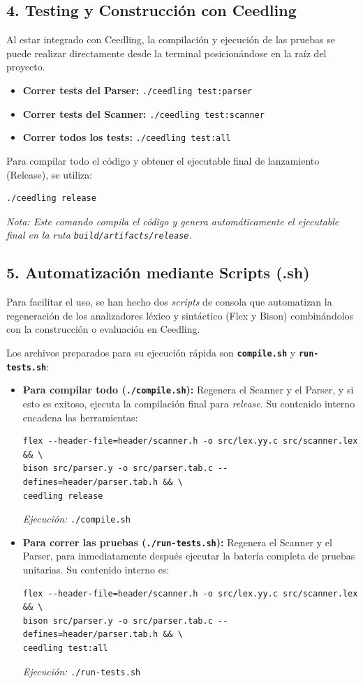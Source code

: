 \documentclass[11pt, a4paper]{article}
\begin{document}
\subsection*{4. Testing y Construcción con Ceedling}
Al estar integrado con Ceedling, la compilación y ejecución de las pruebas se puede realizar directamente desde la terminal posicionándose en la raíz del proyecto.

\begin{itemize}
    \item \textbf{Correr tests del Parser:} \texttt{./ceedling test:parser}
    \item \textbf{Correr tests del Scanner:} \texttt{./ceedling test:scanner}
    \item \textbf{Correr todos los tests:} \texttt{./ceedling test:all}
\end{itemize}

Para compilar todo el código y obtener el ejecutable final de lanzamiento (Release), se utiliza:
\begin{verbatim}
./ceedling release
\end{verbatim}
\textit{Nota: Este comando compila el código y genera automáticamente el ejecutable final en la ruta \texttt{build/artifacts/release}.}

\subsection*{5. Automatización mediante Scripts (.sh)}
Para facilitar el uso, se han hecho dos \textit{scripts} de consola que automatizan la regeneración de los analizadores léxico y sintáctico (Flex y Bison) combinándolos con la construcción o evaluación en Ceedling. 

Los archivos preparados para su ejecución rápida son \textbf{\texttt{compile.sh}} y \textbf{\texttt{run-tests.sh}}:

\begin{itemize}
    \item \textbf{Para compilar todo (\texttt{./compile.sh}):} Regenera el Scanner y el Parser, y si esto es exitoso, ejecuta la compilación final para \textit{release}. Su contenido interno encadena las herramientas:
\begin{verbatim}
flex --header-file=header/scanner.h -o src/lex.yy.c src/scanner.lex && \
bison src/parser.y -o src/parser.tab.c --defines=header/parser.tab.h && \
ceedling release
\end{verbatim}
    \textit{Ejecución:} \texttt{./compile.sh}

    \item \textbf{Para correr las pruebas (\texttt{./run-tests.sh}):} Regenera el Scanner y el Parser, para inmediatamente después ejecutar la batería completa de pruebas unitarias. Su contenido interno es:
\begin{verbatim}
flex --header-file=header/scanner.h -o src/lex.yy.c src/scanner.lex && \
bison src/parser.y -o src/parser.tab.c --defines=header/parser.tab.h && \
ceedling test:all
\end{verbatim}
    \textit{Ejecución:} \texttt{./run-tests.sh}
\end{itemize}
\end{document}
